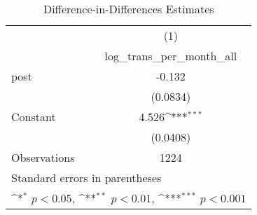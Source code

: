 \begin{table}[htbp]\centering
\def\sym#1{\ifmmode^{#1}\else\(^{#1}\)\fi}
\caption{Difference-in-Differences Estimates\label{tabl}}
\begin{tabular}{l*{1}{c}}
\hline\hline
                    &\multicolumn{1}{c}{(1)}\\
                    &\multicolumn{1}{c}{log\_trans\_per\_month\_all}\\
\hline
post                &      -0.132         \\
                    &    (0.0834)         \\
[1em]
Constant            &       4.526\sym{***}\\
                    &    (0.0408)         \\
\hline
Observations        &        1224         \\
\hline\hline
\multicolumn{2}{l}{\footnotesize Standard errors in parentheses}\\
\multicolumn{2}{l}{\footnotesize \sym{*} \(p<0.05\), \sym{**} \(p<0.01\), \sym{***} \(p<0.001\)}\\
\end{tabular}
\end{table}
